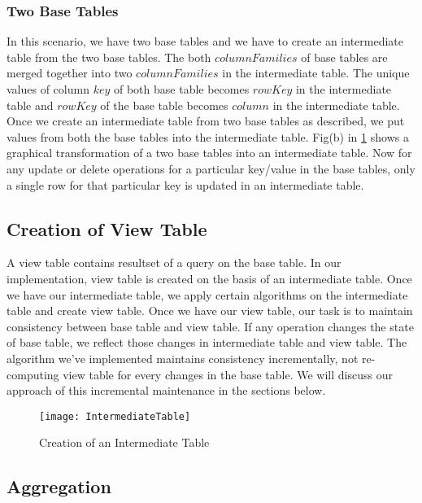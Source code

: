 \documentclass[11pt,a4paper,bibtotoc,idxtotoc,headsepline,footsepline,footexclude,BCOR12mm,DIV13]{scrbook}
\begin{document}
\subsubsection{Two Base Tables}
\label{Two Base Tables}
In this scenario, we have two base tables and we have to create an intermediate table from the two base tables. The both $columnFamilies$ of base tables are merged together into two $columnFamilies$ in the intermediate table. The unique values of column $key$ of both base table becomes $rowKey$ in the intermediate table and $rowKey$ of the base table becomes $column$ in the intermediate table. Once we create an intermediate table from two base tables as described, we put values from both the base tables into the intermediate table. Fig(b) in \ref{Intermediate Table} shows a graphical transformation of a two base tables into an intermediate table. Now for any update or delete operations for a particular key/value in the base tables, only a single row for that particular key is updated in an intermediate table.

\subsection{Creation of View Table}
A view table contains resultset of a query on the base table. In our implementation, view table is created on the basis of an intermediate table. Once we have our intermediate table, we apply certain algorithms on the intermediate table and create view table. Once we have our view table, our task is to maintain consistency between base table and view table. If any operation changes the state of base table, we reflect those changes in intermediate table and view table. The algorithm we've implemented maintains consistency incrementally, not re-computing view table for every changes in the base table. We will discuss our approach of this incremental maintenance in the sections below.

\begin{figure}
    \centering
    \texttt{[image: IntermediateTable]}
    \caption{Creation of an Intermediate Table}
    \label{Intermediate Table}
    
\end{figure}

\newpage
\subsection{Aggregation}
\label{sec:aggregationImpl}
\end{document}
